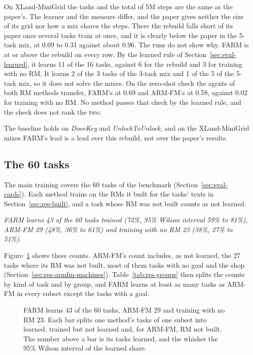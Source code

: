 \documentclass[11pt,english,listoffigures,listoftables]{tfgetsinf}
\newcommand{\env}[1]{\textsf{\slshape #1}}  %
\newcommand{\keyidea}[1]{\par\smallskip\noindent\hspace*{0.6em}{\color{gray!55}\vrule width 1.5pt}\hspace{8pt}\parbox[t]{\dimexpr\linewidth-0.6em-9.5pt\relax}{\itshape #1}\par\smallskip}  %
\begin{document}
On XLand-MiniGrid the tasks and the total of 5M steps are the same as the paper's. The learner and the measure differ, and the paper gives neither the size of its grid nor how a mix shares the steps. There the rebuild falls short of its paper once several tasks train at once, and it is clearly below the paper in the 5-task mix, at 0.09 to 0.31 against about 0.96. The runs do not show why. FARM is at or above the rebuild on every row. By the learned rule of Section~\ref{sec:eval-learned}, it learns 11 of the 16 tasks, against 6 for the rebuild and 3 for training with no RM. It learns 2 of the 3 tasks of the 3-task mix and 1 of the 5 of the 5-task mix, so it does not solve the mixes. On the zero-shot check the agents of both RM methods transfer, FARM's at 0.69 and ARM-FM's at 0.58, against 0.02 for training with no RM. No method passes that check by the learned rule, and the check does not rank the two.

The baseline holds on \env{DoorKey} and \env{UnlockToUnlock}, and on the XLand-MiniGrid mixes FARM's lead is a lead over this rebuild, not over the paper's results.

\subsection{The 60 tasks}
\label{sec:res-60}

The main training covers the 60 tasks of the benchmark (Section~\ref{sec:eval-cards}). Each method trains on the RMs it built for the tasks' texts in Section~\ref{sec:res-built}, and a task whose RM was not built counts as not learned.

\keyidea{FARM learns 43 of the 60 tasks trained (72\%, 95\% Wilson interval 59\% to 81\%), ARM-FM 29 (48\%, 36\% to 61\%) and training with no RM 23 (38\%, 27\% to 51\%).}

\noindent Figure~\ref{fig:res-learned} shows these counts. ARM-FM's count includes, as not learned, the 27 tasks where its RM was not built, most of them tasks with no goal and the shop (Section~\ref{sec:res-armfm-machines}). Table~\ref{tab:res-groups} then splits the counts by kind of task and by group, and FARM learns at least as many tasks as ARM-FM in every subset except the tasks with a goal.

\begin{figure}[!htbp]
\centering

\caption[Tasks learned per method]{FARM learns 43 of the 60 tasks, ARM-FM 29 and training with no RM 23. Each bar splits one method's tasks of one subset into learned, trained but not learned and, for ARM-FM, RM not built. The number above a bar is its tasks learned, and the whisker the 95\% Wilson interval of the learned share.}
\label{fig:res-learned}
\end{figure}
\end{document}
